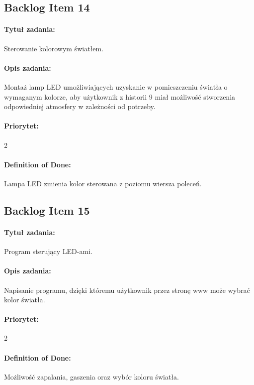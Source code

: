 	\subsection{Backlog Item 14}
	\paragraph{Tytuł zadania:}
	Sterowanie kolorowym światłem.
	
	\paragraph{Opis zadania:}
	Montaż lamp LED umożliwiających uzyskanie w pomieszczeniu światła o wymaganym kolorze, aby użytkownik z historii 9 miał możliwość stworzenia odpowiedniej atmosfery w zależności od potrzeby.
	 
	\paragraph{Priorytet:}
	2
	
	\paragraph{Definition of Done:}
	Lampa LED zmienia kolor sterowana z poziomu wiersza poleceń.



	\subsection{Backlog Item 15}
	\paragraph{Tytuł zadania:}
	Program sterujący LED-ami.
	
	\paragraph{Opis zadania:}
	Napisanie programu, dzięki któremu użytkownik przez stronę www może wybrać kolor światła.
	
	\paragraph{Priorytet:}
	2
	
	\paragraph{Definition of Done:}
	Możliwość zapalania, gaszenia oraz wybór koloru światła.


